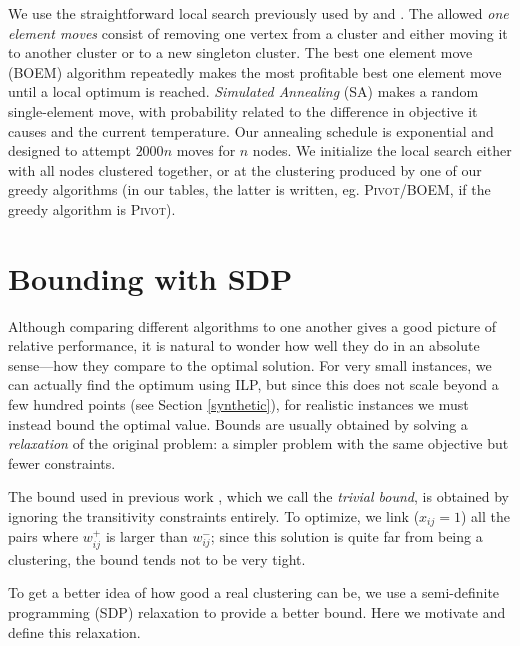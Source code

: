 \documentclass[11pt]{article}
\begin{document}
We use the straightforward local search previously used by
 and . The allowed \emph{one
  element moves} consist of removing one vertex from a cluster and
either moving it to another cluster or to a new singleton cluster. The
best one element move (\textsc{BOEM}) algorithm repeatedly makes the most
profitable best one element move until a local optimum is
reached. {\em Simulated Annealing} (\textsc{SA}) makes a random single-element
move, with probability related to the difference in objective it
causes and the current temperature. Our annealing schedule is
exponential and designed to attempt $2000n$ moves for $n$ nodes. We
initialize the local search either with all nodes clustered together,
or at the clustering produced by one of our greedy algorithms (in our
tables, the latter is written, eg. \textsc{Pivot}/\textsc{BOEM}, if the greedy algorithm
is \textsc{Pivot}).

\section{Bounding with SDP}\label{sec:sdp}

Although comparing different algorithms to one another gives a good
picture of relative performance, it is natural to wonder how well they
do in an absolute sense---how they compare to the optimal
solution. For very small instances, we can actually find the optimum
using ILP, but since this does not scale beyond a few hundred points
(see Section \ref{synthetic}), for realistic instances we must instead
bound the optimal value. Bounds are usually obtained by solving a {\em
  relaxation} of the original problem: a simpler problem with the same
objective but fewer constraints.

The bound used in previous work \cite{Goder08,Gionis07,Bertolacci07},
which we call the {\em trivial bound}, is obtained by ignoring the
transitivity constraints entirely. To optimize, we link ($x_{ij} = 1$)
all the pairs where $w^+_{ij}$ is larger than $w^-_{ij}$; since this
solution is quite far from being a clustering, the bound tends not to
be very tight.

To get a better idea of how good a real clustering can be, we use
a semi-definite programming (SDP) relaxation to provide a better
bound. Here we motivate and define this relaxation.
\end{document}
